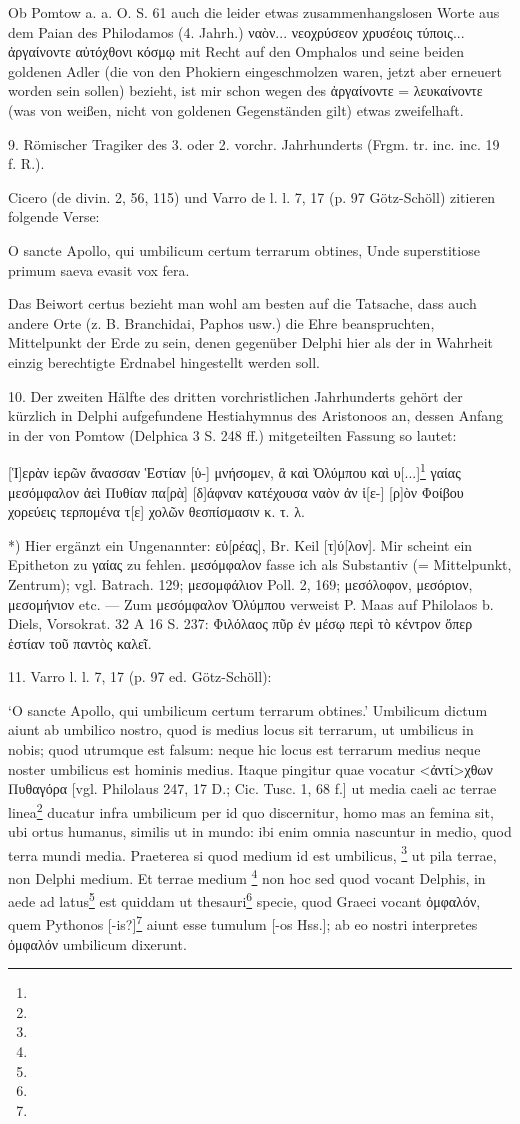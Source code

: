 \documentclass[a4paper, 11pt, oneside]{article}
\begin{document}
Ob Pomtow a. a. O. S. 61 auch die leider etwas zusammenhangslosen Worte aus dem Paian des Philodamos (4. Jahrh.) ναὸν... νεοχρύσεον χρυσέοις τύποις... ἀργαίνοντε αὐτόχθονι κόσμῳ mit Recht auf den Omphalos und seine beiden goldenen Adler (die von den Phokiern eingeschmolzen waren, jetzt aber erneuert worden sein sollen) bezieht, ist mir schon wegen des ἀργαίνοντε = λευκαίνοντε (was von weißen, nicht von goldenen Gegenständen gilt) etwas zweifelhaft.

9. Römischer Tragiker des 3. oder 2. vorchr. Jahrhunderts (Frgm. tr. inc. inc. 19 f. R.).

Cicero (de divin. 2, 56, 115) und Varro de l. l. 7, 17 (p. 97 Götz-Schöll) zitieren folgende Verse:

O sancte Apollo, qui umbilicum certum terrarum obtines,  
Unde superstitiose primum saeva evasit vox fera.

Das Beiwort certus bezieht man wohl am besten auf die Tatsache, dass auch andere Orte (z. B. Branchidai, Paphos usw.) die Ehre beanspruchten, Mittelpunkt der Erde zu sein, denen gegenüber Delphi hier als der in Wahrheit einzig berechtigte Erdnabel hingestellt werden soll.

10. Der zweiten Hälfte des dritten vorchristlichen Jahrhunderts gehört der kürzlich in Delphi aufgefundene Hestiahymnus des Aristonoos an, dessen Anfang in der von Pomtow (Delphica 3 S. 248 ff.) mitgeteilten Fassung so lautet:

[Ἱ]ερὰν ἱερῶν ἄνασσαν Ἑστίαν [ὑ-]  
μνήσομεν, ἃ καὶ Ὀλύμπου καὶ υ[...]\footnote{}  
γαίας μεσόμφαλον ἀεὶ Πυθίαν πα[ρὰ]  
[δ]άφναν κατέχουσα ναὸν ἀν ἱ[ε-]  
[ρ]ὸν Φοίβου χορεύεις τερπομένα τ[ε]  
χολῶν θεσπίσμασιν κ. τ. λ.

*) Hier ergänzt ein Ungenannter: εὐ[ρέας], Br. Keil [τ]ύ[λον]. Mir scheint ein Epitheton zu γαίας zu fehlen. μεσόμφαλον fasse ich als Substantiv (= Mittelpunkt, Zentrum); vgl. Batrach. 129; μεσομφάλιον Poll. 2, 169; μεσόλοφον, μεσόριον, μεσομήνιον etc. --- Zum μεσόμφαλον Ὀλύμπου verweist P. Maas auf Philolaos b. Diels, Vorsokrat. 32 A 16 S. 237: Φιλόλαος πῦρ ἐν μέσῳ περὶ τὸ κέντρον ὅπερ ἑστίαν τοῦ παντὸς καλεῖ.

11. Varro l. l. 7, 17 (p. 97 ed. Götz-Schöll):

`O sancte Apollo, qui umbilicum certum terrarum obtines.' Umbilicum dictum aiunt ab umbilico nostro, quod is medius locus sit terrarum, ut umbilicus in nobis; quod utrumque est falsum: neque hic locus est terrarum medius neque noster umbilicus est hominis medius. Itaque pingitur quae vocatur <ἀντί>χθων Πυθαγόρα [vgl. Philolaus 247, 17 D.; Cic. Tusc. 1, 68 f.] ut media caeli ac terrae linea\footnote{} ducatur infra umbilicum per id quo discernitur, homo mas an femina sit, ubi ortus humanus, similis ut in mundo: ibi enim omnia nascuntur in medio, quod terra mundi media. Praeterea si quod medium id est umbilicus, \footnote{} ut pila terrae, non Delphi medium. Et terrae medium \footnote{} non hoc sed quod vocant Delphis, in aede ad latus\footnote{} est quiddam ut thesauri\footnote{} specie, quod Graeci vocant ὀμφαλόν, quem Pythonos [-is?]\footnote{} aiunt esse tumulum [-os Hss.]; ab eo nostri interpretes ὀμφαλόν umbilicum dixerunt.
\end{document}
